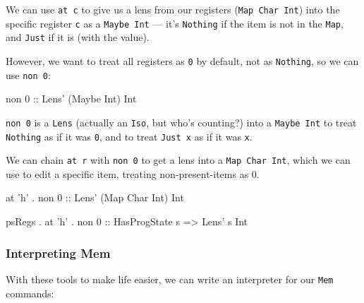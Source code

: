 \documentclass[]{article}
\newenvironment{Shaded}{}{}
\newcommand{\CharTok}[1]{\textcolor[rgb]{0.25,0.44,0.63}{#1}}
\newcommand{\DataTypeTok}[1]{\textcolor[rgb]{0.56,0.13,0.00}{#1}}
\newcommand{\DecValTok}[1]{\textcolor[rgb]{0.25,0.63,0.44}{#1}}
\newcommand{\FunctionTok}[1]{\textcolor[rgb]{0.02,0.16,0.49}{#1}}
\newcommand{\NormalTok}[1]{#1}
\newcommand{\OtherTok}[1]{\textcolor[rgb]{0.00,0.44,0.13}{#1}}
\begin{document}
We can use \texttt{at\ \textquotesingle{}c\textquotesingle{}} to give us a lens
from our registers (\texttt{Map\ Char\ Int}) into the specific register
\texttt{\textquotesingle{}c\textquotesingle{}} as a \texttt{Maybe\ Int} --- it's
\texttt{Nothing} if the item is not in the \texttt{Map}, and \texttt{Just} if it
is (with the value).

However, we want to treat all registers as \texttt{0} by default, not as
\texttt{Nothing}, so we can use \texttt{non\ 0}:

\begin{Shaded}
\begin{Highlighting}[]
\NormalTok{non }\DecValTok{0}\OtherTok{ ::} \DataTypeTok{Lens'}\NormalTok{ (}\DataTypeTok{Maybe} \DataTypeTok{Int}\NormalTok{) }\DataTypeTok{Int}
\end{Highlighting}
\end{Shaded}

\texttt{non\ 0} is a \texttt{Lens} (actually an \texttt{Iso}, but who's
counting?) into a \texttt{Maybe\ Int} to treat \texttt{Nothing} as if it was
\texttt{0}, and to treat \texttt{Just\ x} as if it was \texttt{x}.

We can chain \texttt{at\ r} with \texttt{non\ 0} to get a lens into a
\texttt{Map\ Char\ Int}, which we can use to edit a specific item, treating
non-present-items as 0.

\begin{Shaded}
\begin{Highlighting}[]
\NormalTok{         at }\CharTok{'h'} \FunctionTok{.}\NormalTok{ non }\DecValTok{0}\OtherTok{ ::} \DataTypeTok{Lens'}\NormalTok{ (}\DataTypeTok{Map} \DataTypeTok{Char} \DataTypeTok{Int}\NormalTok{) }\DataTypeTok{Int}

\NormalTok{psRegs }\FunctionTok{.}\NormalTok{ at }\CharTok{'h'} \FunctionTok{.}\NormalTok{ non }\DecValTok{0}\OtherTok{ ::} \DataTypeTok{HasProgState}\NormalTok{ s }\OtherTok{=>} \DataTypeTok{Lens'}\NormalTok{ s }\DataTypeTok{Int}
\end{Highlighting}
\end{Shaded}

\hypertarget{interpreting-mem}{%
\subsubsection{Interpreting Mem}\label{interpreting-mem}}

With these tools to make life easier, we can write an interpreter for our
\texttt{Mem} commands:
\end{document}
